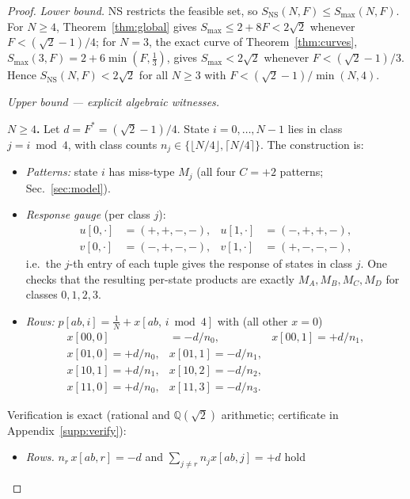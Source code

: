 \documentclass[aps,pra,reprint,superscriptaddress,floatfix]{revtex4-2}
\begin{document}
\begin{proof}
\emph{Lower bound.} NS restricts the feasible set, so
$S_{\mathrm{NS}}(N,F)\le S_{\max}(N,F)$. For $N\ge4$, Theorem~\ref{thm:global}
gives $S_{\max}\le 2+8F<2\sqrt{2}$ whenever $F<(\sqrt{2}-1)/4$; for $N=3$, the
exact curve of Theorem~\ref{thm:curves}, $S_{\max}(3,F)=2+6\min(F,\tfrac13)$,
gives $S_{\max}<2\sqrt{2}$ whenever $F<(\sqrt{2}-1)/3$. Hence
$S_{\mathrm{NS}}(N,F)<2\sqrt{2}$ for all $N\ge3$ with
$F<(\sqrt{2}-1)/\min(N,4)$.

\noindent
\emph{Upper bound --- explicit algebraic witnesses.}

\textbf{$N\ge4$.} Let $d=F^*=(\sqrt{2}-1)/4$. State $i=0,\dots,N-1$ lies in
class $j=i\bmod 4$, with class counts $n_j\in\{\lfloor N/4\rfloor,
\lceil N/4\rceil\}$. The construction is:
\begin{itemize}
\item \emph{Patterns:} state $i$ has miss-type $M_j$ (all four $C=+2$
patterns; Sec.~\ref{sec:model}).
\item \emph{Response gauge} (per class $j$):
\begin{equation}
\begin{aligned}
u[0,\cdot]&=(+,+,-,-), & u[1,\cdot]&=(-,+,+,-),\\
v[0,\cdot]&=(-,+,-,-), & v[1,\cdot]&=(+,-,-,-),
\end{aligned}
\label{eq:ns4gauge}
\end{equation}
i.e.\ the $j$-th entry of each tuple gives the response of states in class
$j$. One checks that the resulting per-state products are exactly
$M_A,M_B,M_C,M_D$ for classes $0,1,2,3$.
\item \emph{Rows:} $p[ab,i]=\frac1N+x[ab,\,i\bmod 4]$ with (all other
$x=0$)
\begin{equation}
\begin{array}{lll}
x[00,0]&=-d/n_0, & x[00,1]=+d/n_1,\\
x[01,0]=+d/n_0, & x[01,1]=-d/n_1,\\
x[10,1]=+d/n_1, & x[10,2]=-d/n_2,\\
x[11,0]=+d/n_0, & x[11,3]=-d/n_3.
\end{array}
\label{eq:ns4rows}
\end{equation}
\end{itemize}
Verification is exact (rational and $\mathbb{Q}(\sqrt2)$ arithmetic;
certificate in Appendix~\ref{supp:verify}):
\begin{itemize}
\item \emph{Rows.} $n_r\,x[ab,r]=-d$ and $\sum_{j\ne r}n_j x[ab,j]=+d$ hold

\end{itemize}
\end{proof}
\end{document}
